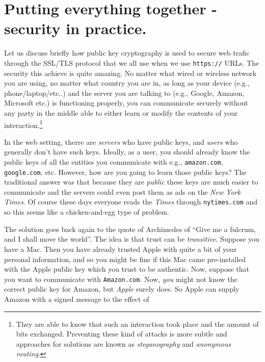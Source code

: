 \hypertarget{nonromsec}{}

\section{Putting everything together - security in
practice.}\label{10-Putting-everything-tog}

Let us discuss briefly how public key cryptography is used to secure web
trafic through the SSL/TLS protocol that we all use when we use
\texttt{https://} URLs. The security this achieve is quite amazing. No
matter what wired or wireless network you are using, no matter what
country you are in, as long as your device (e.g., phone/laptop/etc..)
and the server you are talking to (e.g., Google, Amazon, Microsoft etc.)
is functioning properly, you can communicate securely without any party
in the middle able to either learn or modify the contents of your
interaction.\footnote{They are able to know that such an interaction
  took place and the amount of bits exchanged. Preventing these kind of
  attacks is more subtle and approaches for solutions are known as
  \emph{steganography} and \emph{anonymous routing}.}

In the web setting, therre are \emph{servers} who have public keys, and
\emph{users} who generally don't have such keys. Ideally, as a user, you
should already know the public keys of all the entities you communicate
with e.g., \texttt{amazon.com}, \texttt{google.com}, etc. However, how
are you going to learn those public keys? The traditional answer was
that because they are \emph{public} these keys are much easier to
communicate and the servers could even post them as ads on the \emph{New
York Times}. Of course these days everyone reads the \emph{Times}
through \texttt{nytimes.com} and so this seems like a chicken-and-egg
type of problem.

The solution goes back again to the quote of Archimedes of ``Give me a
fulcrum, and I shall move the world''. The idea is that trust can be
\emph{transitive}. Suppose you have a Mac. Then you have already trusted
Apple with quite a bit of your personal information, and so you might be
fine if this Mac came pre-installed with the Apple public key which you
trust to be authentic. Now, suppose that you want to communicate with
\texttt{Amazon.com}. Now, \emph{you} might not know the correct public
key for Amazon, but \emph{Apple} surely does. So Apple can supply Amazon
with a signed message to the effect of

